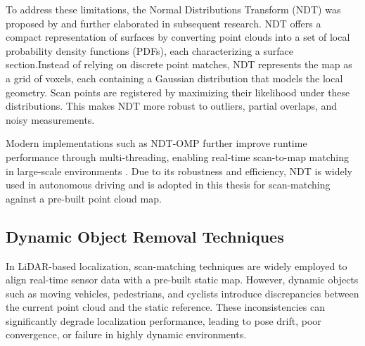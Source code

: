 To address these limitations, the Normal Distributions Transform (NDT) was proposed by \cite{biber2003ndt} and
further elaborated in subsequent research\cite{magnusson2007ndt}.  NDT offers a compact representation
of surfaces by converting point clouds into a set of local probability density functions
(PDFs), each characterizing a surface section.Instead of relying on discrete point matches, NDT represents the map as a grid of voxels, each containing a Gaussian distribution that models the local geometry. Scan points are registered by maximizing their likelihood under these distributions. This makes NDT more robust to outliers, partial overlaps, and noisy measurements.

Modern implementations such as NDT-OMP further improve runtime performance through multi-threading, enabling real-time scan-to-map matching in large-scale environments \cite{koide2019portable}. Due to its robustness and efficiency, NDT is widely used in autonomous driving and is adopted in this thesis for scan-matching against a pre-built point cloud map.

\subsection{Dynamic Object Removal Techniques}

In LiDAR-based localization, scan-matching techniques are widely employed to align real-time sensor data with a pre-built static map. However, dynamic objects such as moving vehicles, pedestrians, and cyclists introduce discrepancies between the current point cloud and the static reference. These inconsistencies can significantly degrade localization performance, leading to pose drift, poor convergence, or failure in highly dynamic environments.

